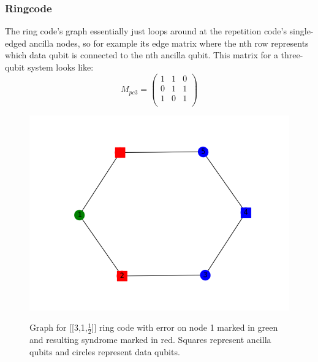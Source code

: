 \subsubsection{Ringcode}
The ring code's graph essentially just loops around at the repetition
code's single-edged ancilla nodes, so for example its edge matrix where the nth row
represents which data qubit is connected to the nth ancilla
qubit.
This matrix for a three-qubit system looks like:
\begin{equation}
    M_{pc3} = \left(
        \begin{array}{ccc}
            1 & 1 & 0\\
            0 & 1 & 1\\
            1 & 0 & 1\\
        \end{array}
        \right)
\end{equation}

\begin{figure}[h!]
	\begin{center}
	\captionsetup{justification=centering,margin=2cm}
	\includegraphics[scale=0.4]{./img/figures/ring_3_graph.png}\\
	\caption{Graph for [[3,1,$\frac{1}{2}$]] ring code with error on node
    1 marked in green and resulting syndrome marked in red.
    Squares represent ancilla qubits and circles represent data qubits.}
        
	\label{fig: ring_graph}
	\end{center}
\end{figure}
